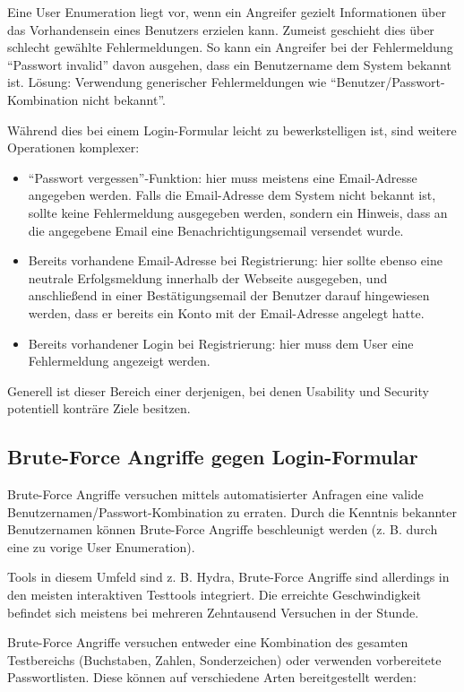 Eine User Enumeration liegt vor, wenn ein Angreifer gezielt Informationen über das Vorhandensein eines Benutzers erzielen kann. Zumeist geschieht dies über schlecht gewählte Fehlermeldungen. So kann ein Angreifer bei der Fehlermeldung ``Passwort invalid'' davon ausgehen, dass ein Benutzername dem System bekannt ist. Lösung: Verwendung generischer Fehlermeldungen wie ``Benutzer/Passwort-Kombination nicht bekannt''.

Während dies bei einem Login-Formular leicht zu bewerkstelligen ist, sind weitere Operationen komplexer:

\begin{itemize}
	\item ``Passwort vergessen''-Funktion: hier muss meistens eine Email-Adresse angegeben werden. Falls die Email-Adresse dem System nicht bekannt ist, sollte keine Fehlermeldung ausgegeben werden, sondern ein Hinweis, dass an die angegebene Email eine Benachrichtigungsemail versendet wurde.
	\item Bereits vorhandene Email-Adresse bei Registrierung: hier sollte ebenso eine neutrale Erfolgsmeldung innerhalb der Webseite ausgegeben, und anschließend in einer Bestätigungsemail der Benutzer darauf hingewiesen werden, dass er bereits ein Konto mit der Email-Adresse angelegt hatte.
	\item Bereits vorhandener Login bei Registrierung: hier muss dem User eine Fehlermeldung angezeigt werden.
\end{itemize}

Generell ist dieser Bereich einer derjenigen, bei denen Usability und Security potentiell konträre Ziele besitzen.

\subsection{Brute-Force Angriffe gegen Login-Formular}

Brute-Force Angriffe versuchen mittels automatisierter Anfragen eine valide Benutzernamen/Passwort-Kombination zu erraten. Durch die Kenntnis bekannter Benutzernamen können Brute-Force Angriffe beschleunigt werden (z. B. durch eine zu vorige User Enumeration).

Tools in diesem Umfeld sind z. B. Hydra, Brute-Force Angriffe sind allerdings in den meisten interaktiven Testtools integriert. Die erreichte Geschwindigkeit befindet sich meistens bei mehreren Zehntausend Versuchen in der Stunde.

Brute-Force Angriffe versuchen entweder eine Kombination des gesamten Testbereichs (Buchstaben, Zahlen, Sonderzeichen) oder verwenden vorbereitete Passwortlisten. Diese können auf verschiedene Arten bereitgestellt werden:

